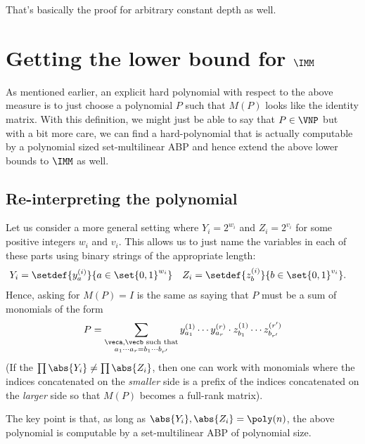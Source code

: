 That's basically the proof for arbitrary constant depth as well.\\


\section{Getting the lower bound for $\IMM$}

As mentioned earlier, an explicit hard polynomial with respect to the above measure is to just choose a polynomial $P$ such that $M(P)$ looks like the identity matrix. With this definition, we might just be able to say that $P \in \VNP$ but with a bit more care, we can find a hard-polynomial that is actually computable by a polynomial sized set-multilinear ABP and hence extend the above lower bounds to $\IMM$ as well.

\subsection{Re-interpreting the polynomial}

Let us consider a more general setting where $Y_i = 2^{w_i}$ and $Z_i = 2^{v_i}$ for some positive integers $w_i$ and $v_i$. This allows us to just name the variables in each of these parts using binary strings of the appropriate length:
\begin{align*}
  Y_i &= \setdef{y_{a}^{(i)}}{a \in \set{0,1}^{w_i}}&
  Z_i &= \setdef{z_{b}^{(i)}}{b \in \set{0,1}^{v_i}}.
\end{align*}
Hence, asking for $M(P) = I$ is the same as saying that $P$ must be a sum of monomials of the form
\[
  P = \sum_{\substack{\veca,\vecb \text{ such that}\\a_1\cdots a_r = b_1 \cdots b_{r'}}}y_{a_1}^{(1)} \cdots y_{a_r}^{(r)} \cdot z_{b_1}^{(1)} \cdots z_{b_{r'}}^{(r')}
\]
(If the $\prod \abs{Y_i} \neq \prod \abs{Z_i}$, then one can work with monomials where the indices concatenated on the \emph{smaller} side is a prefix of the indices concatenated on the \emph{larger} side so that $M(P)$ becomes a full-rank matrix).

The key point is that, as long as $\abs{Y_i}, \abs{Z_i} = \poly(n)$, the above polynomial is computable by a set-multilinear ABP of polynomial size.

